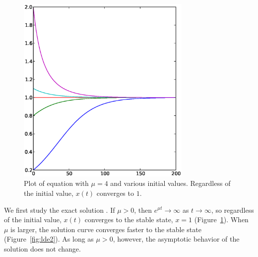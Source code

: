 \documentclass[12pt,twoside]{book}
\begin{document}
\begin{figure}[ht]
  \begin{center}
    \includegraphics[width=0.75\textwidth]{logistic_diffeq_mu4_varyingx0}
  \end{center}
  \caption{
    Plot of equation  with $\mu = 4$ and various initial values. 
  Regardless of the initial value, $x(t)$ converges to $1$.
}
  \label{fig:lde1}
\end{figure}
We first study the exact solution .
If $\mu > 0$, then $e^{\mu t} \to \infty$ as $t \to \infty$, so regardless of the initial value, $x(t)$ converges to the stable state, $x = 1$ (Figure~\ref{fig:lde1}).
%
When $\mu$ is larger, the solution curve converges faster to the stable state (Figure~\ref{fig:lde2}).
As long as $\mu > 0$, however, the asymptotic behavior of the solution does not change.
\end{document}
